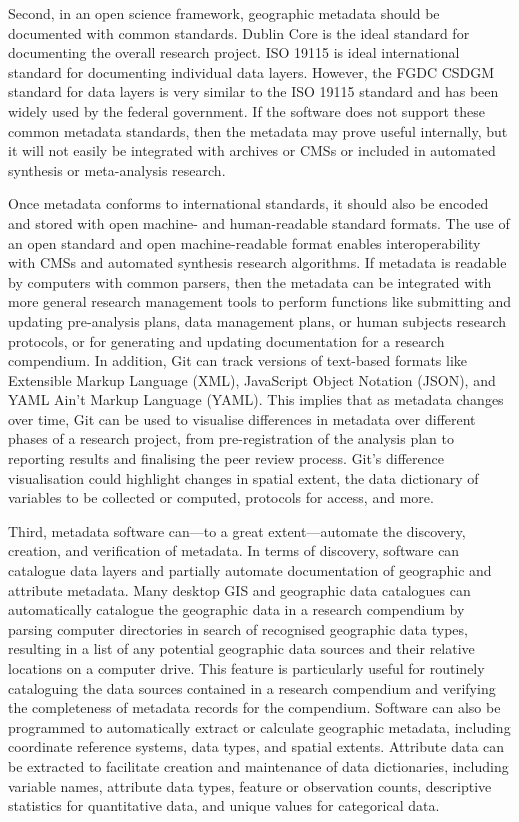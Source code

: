 \documentclass{isprs} %
\begin{document}
Second, in an open science framework, geographic metadata should be documented with common standards. Dublin Core is the ideal standard for documenting the overall research project. ISO 19115 is ideal international standard for documenting individual data layers.
However, the FGDC CSDGM standard for data layers is very similar to the ISO 19115 standard and has been widely used by the federal government.
If the software does not support these common metadata standards, then the metadata may prove useful internally, but it will not easily be integrated with archives or CMSs or included in automated synthesis or meta-analysis research.

Once metadata conforms to international standards, it should also be encoded and stored with open machine- and human-readable standard formats. 
The use of an open standard and open machine-readable format enables interoperability with CMSs and automated synthesis research algorithms.
If metadata is readable by computers with common parsers, then the metadata can be integrated with more general research management tools to perform functions like submitting and updating pre-analysis plans, data management plans, or human subjects research protocols, or for generating and updating documentation for a research compendium.
In addition, Git can track versions of text-based formats like Extensible Markup Language (XML), JavaScript Object Notation (JSON), and YAML Ain't Markup Language (YAML).
This implies that as metadata changes over time, Git can be used to visualise differences in metadata over different phases of a research project, from pre-registration of the analysis plan to reporting results and finalising the peer review process.
Git's difference visualisation could highlight changes in spatial extent, the data dictionary of variables to be collected or computed, protocols for access, and more. 

Third, metadata software can---to a great extent---automate the discovery, creation, and verification of metadata.
In terms of discovery, software can catalogue data layers and partially automate documentation of geographic and attribute metadata.
Many desktop GIS and geographic data catalogues can automatically catalogue the geographic data in a research compendium by parsing computer directories in search of recognised geographic data types, resulting in a list of any potential geographic data sources and their relative locations on a computer drive.
This feature is particularly useful for routinely cataloguing the data sources contained in a research compendium and verifying the completeness of metadata records for the compendium.
Software can also be programmed to automatically extract or calculate geographic metadata, including coordinate reference systems, data types, and spatial extents.
Attribute data can be extracted to facilitate creation and maintenance of data dictionaries, including variable names, attribute data types, feature or observation counts, descriptive statistics for quantitative data, and unique values for categorical data.
\end{document}
